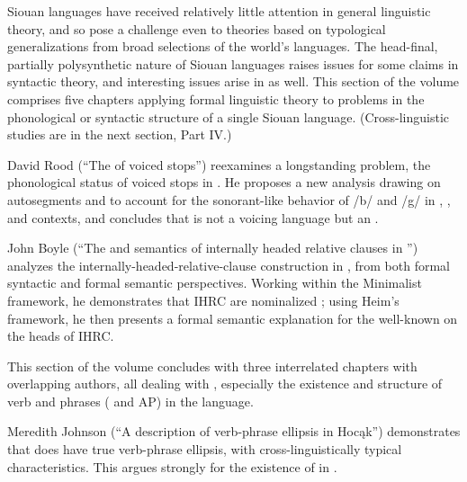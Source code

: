 \begin{refsection}

Siouan languages have received relatively little attention in general linguistic theory, and so pose a challenge even to theories based on typological generalizations from broad selections of the world's languages. The head-final, partially polysynthetic nature of Siouan languages raises issues for some claims in syntactic theory, and interesting issues arise in  as well. This section of the volume comprises five chapters applying formal linguistic theory to problems in the phonological or syntactic structure of a single Siouan language. (Cross-linguistic studies are in the next section, Part IV.)

David Rood (``The  of  voiced stops'') reexamines a longstanding problem, the phonological status of voiced stops in . He proposes a new analysis drawing on autosegments and  to account for the sonorant-like behavior of /b/ and /g/ in , , and  contexts, and concludes that  is not a voicing language but an . 

John Boyle (``The  and semantics of internally headed relative clauses in '') analyzes the internally-headed-relative-clause construction in , from both formal syntactic and formal semantic perspectives. Working within the Minimalist framework, he demonstrates that  IHRC are nominalized ; using Heim's framework, he then presents a formal semantic explanation for the well-known  on the heads of IHRC. 

This section of the volume concludes with three interrelated chapters with overlapping authors, all dealing with  , especially the existence and structure of verb and  phrases ( and AP) in the language.

Meredith Johnson (``A description of verb-phrase ellipsis in Hoc\k{a}k'') demonstrates that  does have true verb-phrase ellipsis, with cross-linguistically typical characteristics. This argues strongly for the existence of  in .


\end{refsection}
